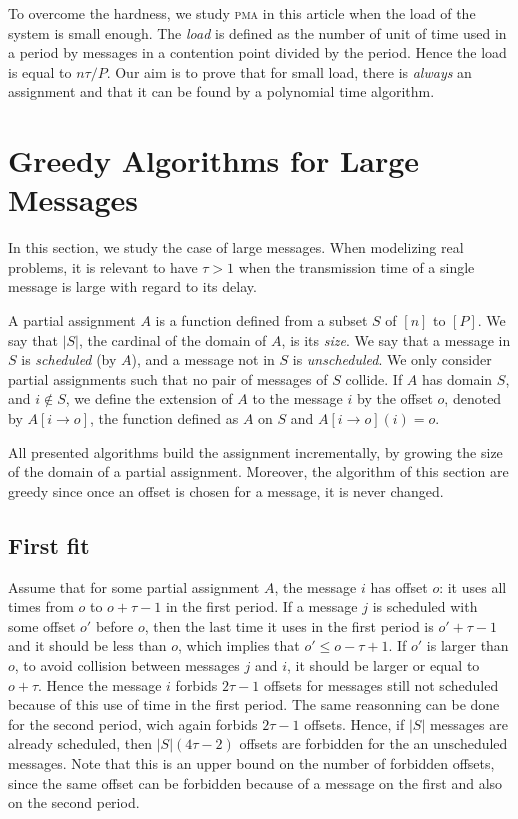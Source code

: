 \documentclass[10pt, conference, letterpaper]{IEEEtran}
\newcommand\pma{\textsc{pma}\xspace}
\begin{document}
To overcome the hardness, we study \pma in this article when the load of the system is small enough. The \emph{load} is defined as the number of unit of time used in a period by messages in a contention point divided by the period. Hence the load is equal to $n\tau /P$.
Our aim is to prove that for small load, there is \emph{always} an assignment and that it can be found by a polynomial time algorithm.


\section{Greedy Algorithms for Large Messages}

In this section, we study the case of large messages. When modelizing real problems,
it is relevant to have $\tau > 1$ when the transmission time of a single message is large with regard to its delay.


A partial assignment $A$ is a function defined from a subset $S$ of $[n]$ to $[P]$.
We say that $|S|$, the cardinal of the domain of $A$, is its \emph{size}.
We say that a message in $S$ is \emph{scheduled} (by $A$), and a message not in $S$ is \emph{unscheduled}. We only consider partial assignments such that no pair of messages of $S$ collide. If $A$ has domain $S$, and $i \notin S$, we define the extension of $A$ to the message $i$ by the offset $o$, denoted by $A[i \rightarrow o]$, the function defined as $A$ on $S$ and $A[i \rightarrow o](i) = o$.

All presented algorithms build the assignment incrementally, by growing the size of the domain of a partial assignment. Moreover, the algorithm of this section are greedy since once an offset is chosen for a message, it is never changed.


\subsection{First fit}


Assume that for some partial assignment $A$, the message $i$ has offset $o$: it uses all times from $o$ to $o + \tau -1$ in the first period. If a message $j$ is scheduled with some offset $o'$ before $o$, then the last time it uses in the first period is $o'+\tau-1$ and it should be less than $o$, which implies that $o' \leq o - \tau + 1$. If $o'$ is larger than $o$, to avoid collision between messages $j$ and $i$, it should be larger or equal to $o+ \tau$. Hence the message $i$ forbids $2\tau -1$ offsets for messages still not scheduled because of this use of time in the first period. The same reasonning can be done for the second period, wich again forbids $2\tau -1$ offsets. Hence, if $|S|$ messages are already scheduled, then $|S|(4\tau -2)$ offsets are forbidden for the an unscheduled messages. Note that this is an upper bound on the number of forbidden offsets, since the same offset can be forbidden because of a message on the first and also on the second period.
\end{document}
